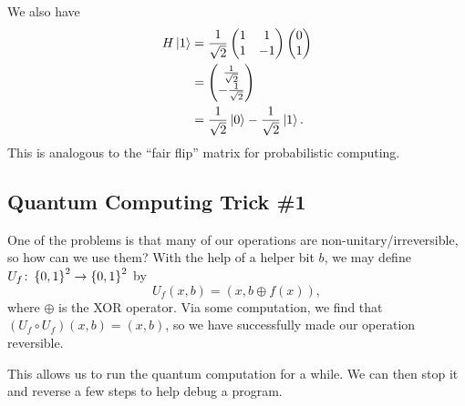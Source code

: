 \documentclass[class=article, crop=false]{standalone}
\begin{document}
  We also have
  \begin{align*}
    H\left\lvert 1 \right\rangle &= \frac{1}{\sqrt{2}}\begin{pmatrix}
      1 & 1 \\
      1 & -1
    \end{pmatrix}\begin{pmatrix}
      0 \\
      1
    \end{pmatrix} \\
             &= \begin{pmatrix}
              \frac{1}{\sqrt{2}} \\
              -\frac{1}{\sqrt{2}}
             \end{pmatrix} \\
             &= \frac{1}{\sqrt{2}}\left\lvert 0 \right\rangle - \frac{1}{\sqrt{2}}\left\lvert 1 \right\rangle.
  \end{align*}
  This is analogous to the ``fair flip'' matrix for probabilistic computing. \par
  \subsection{Quantum Computing Trick \#1}
  One of the problems is that many of our operations are non-unitary/irreversible, so how can we use them? With the help of a helper bit $b$, we may define $U_f\colon \left\{0, 1\right\}^2\to \left\{0, 1\right\}^2$ by
  \[
    U_f(x, b) = (x, b\oplus f(x)),
  \]
  where $\oplus$ is the XOR operator. Via some computation, we find that $(U_f\circ U_f)(x, b) = (x, b)$, so we have successfully made our operation reversible. \par
  This allows us to run the quantum computation for a while. We can then stop it and reverse a few steps to help debug a program.
\end{document}
